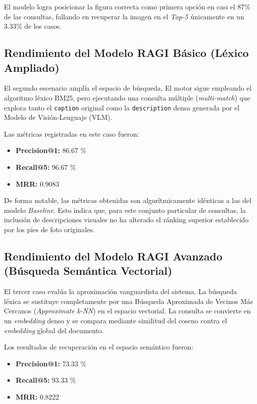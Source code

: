 \documentclass[../main.tex]{subfiles}
\begin{document}
El modelo logra posicionar la figura correcta como primera opción en casi el 87\% de las consultas, fallando en recuperar la imagen en el \textit{Top-5} únicamente en un 3.33\% de los casos.

\subsection{Rendimiento del Modelo RAGI Básico (Léxico Ampliado)}
El segundo escenario amplía el espacio de búsqueda. El motor sigue empleando el algoritmo léxico BM25, pero ejecutando una consulta múltiple (\textit{multi-match}) que explora tanto el \texttt{caption} original como la \texttt{description} densa generada por el Modelo de Visión-Lenguaje (VLM).

Las métricas registradas en este caso fueron:
\begin{itemize}
    \item \textbf{Precision@1:} 86.67 \%
    \item \textbf{Recall@5:} 96.67 \%
    \item \textbf{MRR:} 0.9083
\end{itemize}

De forma notable, las métricas obtenidas son algorítmicamente idénticas a las del modelo \textit{Baseline}. Esto indica que, para este conjunto particular de consultas, la inclusión de descripciones visuales no ha alterado el ránking superior establecido por los pies de foto originales.

\subsection{Rendimiento del Modelo RAGI Avanzado (Búsqueda Semántica Vectorial)}
El tercer caso evalúa la aproximación vanguardista del sistema. La búsqueda léxica se sustituye completamente por una Búsqueda Aproximada de Vecinos Más Cercanos (\textit{Approximate k-NN}) en el espacio vectorial. La consulta se convierte en un \textit{embedding} denso y se compara mediante similitud del coseno contra el \textit{embedding} global del documento.

Los resultados de recuperación en el espacio semántico fueron:
\begin{itemize}
    \item \textbf{Precision@1:} 73.33 \%
    \item \textbf{Recall@5:} 93.33 \%
    \item \textbf{MRR:} 0.8222
\end{itemize}
\end{document}
